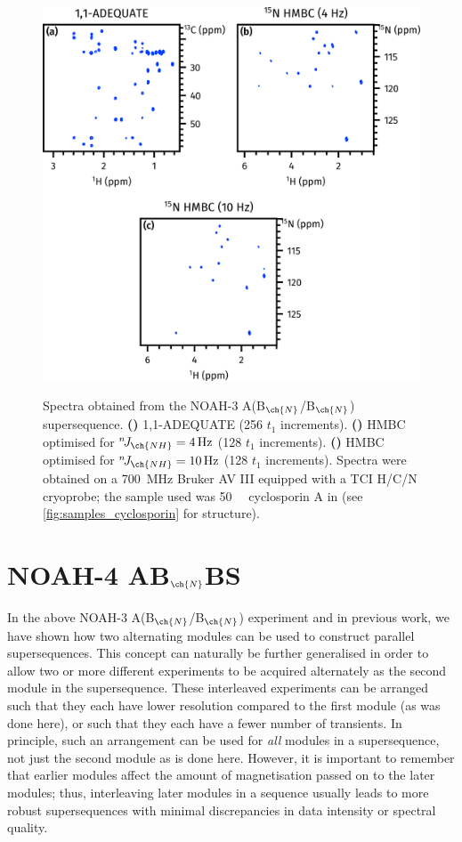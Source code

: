 \documentclass[a4paper,12pt]{article}
\newcommand{\nitrogen}{\ch{^{15}N}}
\newcommand{\njnh}{{}^n\!J_{\ch{NH}}}
\newcommand*{\cyclo}{Spectra were obtained on a \SI{700}{\MHz} Bruker AV III equipped with a TCI H/C/N cryoprobe; the sample used was \SI{50}{\milli\molar} cyclosporin A in \ch{C6D6}}
\newcommand{\abnbn}{NOAH-3 A(B$_{\ch{N}}$/B$_{\ch{N}}$)}
\begin{document}
\begin{refsection}
\begin{figure}[ht]
    \centering
    \includegraphics[]{abb.png}%
    {\label{fig:abb_adeq}}
    {\label{fig:abb_n_hmbc1}}
    {\label{fig:abb_n_hmbc2}}
    \caption{
        Spectra obtained from the \abnbn{} supersequence.
        \textbf{()} 1,1-ADEQUATE (256 $t_1$ increments).
        \textbf{()} \nitrogen{} HMBC optimised for $\njnh = \SI{4}{Hz}$ (128 $t_1$ increments).
        \textbf{()} \nitrogen{} HMBC optimised for $\njnh = \SI{10}{Hz}$ (128 $t_1$ increments).
        \cyclo{} (see \cref{fig:samples_cyclosporin} for structure).
    }
    \label{fig:abb}
\end{figure}

\section{NOAH-4 AB\texorpdfstring{$_{\ch{N}}$}{n}BS}

In the above \abnbn{} experiment and in previous work,\autocite{Kupce2021JACSA} we have shown how two alternating modules can be used to construct parallel supersequences.
This concept can naturally be further generalised in order to allow two or more different experiments to be acquired alternately as the second module in the supersequence.
These interleaved experiments can be arranged such that they each have lower resolution compared to the first module (as was done here), or such that they each have a fewer number of transients.
In principle, such an arrangement can be used for \textit{all} modules in a supersequence, not just the second module as is done here.
However, it is important to remember that earlier modules affect the amount of magnetisation passed on to the later modules; thus, interleaving later modules in a sequence usually leads to more robust supersequences with minimal discrepancies in data intensity or spectral quality.


\end{refsection}
\end{document}

